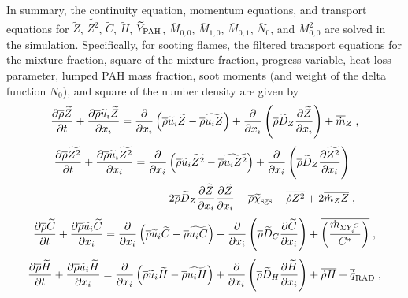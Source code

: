 In summary, the continuity equation, momentum equations, and transport equations for $\widetilde{Z}$, $\widetilde{Z^2}$, $\widetilde{C}$, $\widetilde{H}$, $\widetilde{Y}_{\rm PAH}$, $\overline{M}_{0,0}$, $\overline{M}_{1,0}$, $\overline{M}_{0,1}$, $\overline{N}_0$, and $\overline{M_{0,0}^2}$ are solved in the simulation.  Specifically, for sooting flames, the filtered transport equations for the mixture fraction, square of the mixture fraction, progress variable, heat loss parameter, lumped PAH mass fraction, soot moments (and weight of the delta function $N_0$), and square of the number density are given by
\begin{equation}
  \frac{\partial \overline{\rho}\widetilde{Z}}{\partial t} +
  \frac{\partial \overline{\rho}\widetilde{u}_i\widetilde{Z}}{\partial x_i} =
  \frac{\partial }{\partial x_i}\left(\overline{\rho}\widetilde{u}_i\widetilde{Z}-\overline{\rho}\widetilde{u_iZ}\right) +
  \frac{\partial }{\partial x_i}\left(\overline{\rho}\widetilde{D}_Z\frac{\partial \widetilde{Z}}{\partial x_i}\right) +
  \overline{\dot{m}}_Z\;,
  \label{eq:LES-zfilter}
\end{equation}
\begin{equation}
  \begin{split}
    \frac{\partial \overline{\rho}\widetilde{Z^2}}{\partial t} +
    \frac{\partial \overline{\rho}\widetilde{u}_i\widetilde{Z^2}}{\partial x_i} &= \frac{\partial }{\partial x_i}\left(\overline{\rho}\widetilde{u}_i\widetilde{Z^2}-\overline{\rho}\widetilde{u_iZ^2}\right) + \frac{\partial }{\partial x_i}\left(\overline{\rho}\widetilde{D}_Z\frac{\partial \widetilde{Z^2}}{\partial x_i}\right)\\
    &\qquad -2\overline{\rho}\widetilde{D}_Z\frac{\partial \widetilde{Z}}{\partial x_i}\frac{\partial \widetilde{Z}}{\partial x_i} 
    - \overline{\rho}\widetilde{\chi}_{\rm sgs} -
    \overline{\dot{\rho}Z^2} + 2\overline{\dot{m}_ZZ}\;,
    \label{eq:LES-z2filter}
  \end{split}
\end{equation}
\begin{equation}
  \frac{\partial \overline{\rho}\widetilde{C}}{\partial t} +
  \frac{\partial \overline{\rho}\widetilde{u}_i\widetilde{C}}{\partial x_i} =
  \frac{\partial }{\partial x_i}\left(\overline{\rho}\widetilde{u}_i\widetilde{C}-\overline{\rho}\widetilde{u_iC}\right) +
  \frac{\partial }{\partial x_i}\left(\overline{\rho}\widetilde{D}_C\frac{\partial \widetilde{C}}{\partial x_i}\right) +
  \overline{\left(\frac{\dot{m}_{\Sigma Y_i^C}}{C^\ast}\right)}\;,
  \label{eq:LES-cfilter}
\end{equation}
\begin{equation}
  \frac{\partial \overline{\rho}\widetilde{H}}{\partial t} +
  \frac{\partial \overline{\rho}\widetilde{u}_i\widetilde{H}}{\partial x_i} =
  \frac{\partial }{\partial x_i}\left(\overline{\rho}\widetilde{u}_i\widetilde{H}-\overline{\rho}\widetilde{u_iH}\right) +
  \frac{\partial }{\partial x_i}\left(\overline{\rho}\widetilde{D}_H\frac{\partial \widetilde{H}}{\partial x_i}\right) +
  \overline{\dot{\rho}H} + \overline{\dot{q}}_{\rm RAD}\;,
  \label{eq:LES-hfilter}
\end{equation}
